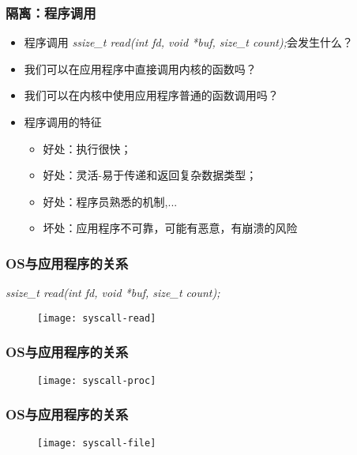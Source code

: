 
\begin{frame}
	\frametitle{隔离：\small{程序调用}}
	\begin{itemize}
		\item 程序调用 \textit{ssize\_t read(int fd, void *buf, size\_t count);}会发生什么？
		\item 我们可以在应用程序中直接调用内核的函数吗？
		\item 我们可以在内核中使用应用程序普通的函数调用吗？ \pause
		\item 程序调用的特征
		\begin{itemize}
			\item 好处：执行很快；
			\item 好处：灵活-易于传递和返回复杂数据类型；
			\item 好处：程序员熟悉的机制,...
			\item 坏处：应用程序不可靠，可能有恶意，有崩溃的风险
			
		\end{itemize}
	\end{itemize}
\end{frame}


\begin{frame}
    
    \frametitle{OS与应用程序的关系}
     \small{\textit{ssize\_t read(int fd, void *buf, size\_t count);}}
    \begin{figure}
        \centering
        \texttt{[image: syscall-read]}
    \end{figure}
    
\end{frame}


\begin{frame}
    
    \frametitle{OS与应用程序的关系}
    
    \begin{figure}
        \centering
        \texttt{[image: syscall-proc]}
    \end{figure}
    
\end{frame}


\begin{frame}
    
    \frametitle{OS与应用程序的关系}
    
    \begin{figure}
        \centering
        \texttt{[image: syscall-file]}
    \end{figure}
    
\end{frame}


